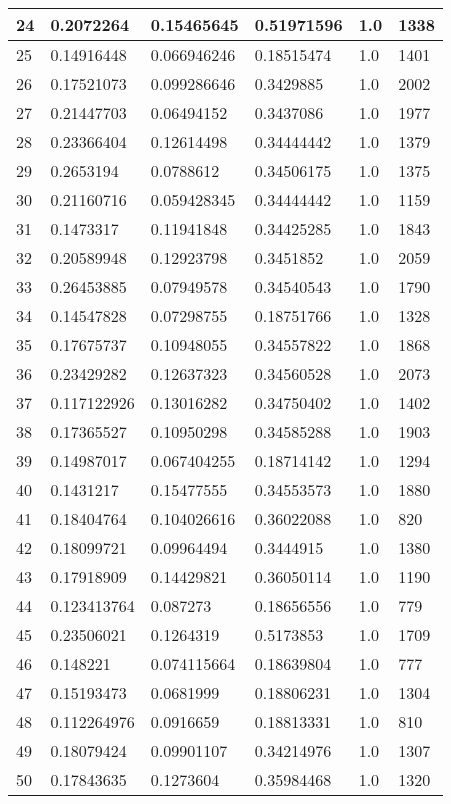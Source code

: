 \begin{longtable}{|l|l|l|l|l|l|}
24 & 0.2072264 & 0.15465645 & 0.51971596 & 1.0 & 1338 \\ \hline 
25 & 0.14916448 & 0.066946246 & 0.18515474 & 1.0 & 1401 \\ \hline 
26 & 0.17521073 & 0.099286646 & 0.3429885 & 1.0 & 2002 \\ \hline 
27 & 0.21447703 & 0.06494152 & 0.3437086 & 1.0 & 1977 \\ \hline 
28 & 0.23366404 & 0.12614498 & 0.34444442 & 1.0 & 1379 \\ \hline 
29 & 0.2653194 & 0.0788612 & 0.34506175 & 1.0 & 1375 \\ \hline 
30 & 0.21160716 & 0.059428345 & 0.34444442 & 1.0 & 1159 \\ \hline 
31 & 0.1473317 & 0.11941848 & 0.34425285 & 1.0 & 1843 \\ \hline 
32 & 0.20589948 & 0.12923798 & 0.3451852 & 1.0 & 2059 \\ \hline 
33 & 0.26453885 & 0.07949578 & 0.34540543 & 1.0 & 1790 \\ \hline 
34 & 0.14547828 & 0.07298755 & 0.18751766 & 1.0 & 1328 \\ \hline 
35 & 0.17675737 & 0.10948055 & 0.34557822 & 1.0 & 1868 \\ \hline 
36 & 0.23429282 & 0.12637323 & 0.34560528 & 1.0 & 2073 \\ \hline 
37 & 0.117122926 & 0.13016282 & 0.34750402 & 1.0 & 1402 \\ \hline 
38 & 0.17365527 & 0.10950298 & 0.34585288 & 1.0 & 1903 \\ \hline 
39 & 0.14987017 & 0.067404255 & 0.18714142 & 1.0 & 1294 \\ \hline 
40 & 0.1431217 & 0.15477555 & 0.34553573 & 1.0 & 1880 \\ \hline 
41 & 0.18404764 & 0.104026616 & 0.36022088 & 1.0 & 820 \\ \hline 
42 & 0.18099721 & 0.09964494 & 0.3444915 & 1.0 & 1380 \\ \hline 
43 & 0.17918909 & 0.14429821 & 0.36050114 & 1.0 & 1190 \\ \hline 
44 & 0.123413764 & 0.087273 & 0.18656556 & 1.0 & 779 \\ \hline 
45 & 0.23506021 & 0.1264319 & 0.5173853 & 1.0 & 1709 \\ \hline 
46 & 0.148221 & 0.074115664 & 0.18639804 & 1.0 & 777 \\ \hline 
47 & 0.15193473 & 0.0681999 & 0.18806231 & 1.0 & 1304 \\ \hline 
48 & 0.112264976 & 0.0916659 & 0.18813331 & 1.0 & 810 \\ \hline 
49 & 0.18079424 & 0.09901107 & 0.34214976 & 1.0 & 1307 \\ \hline 
50 & 0.17843635 & 0.1273604 & 0.35984468 & 1.0 & 1320 \\ \hline 
\end{longtable}
